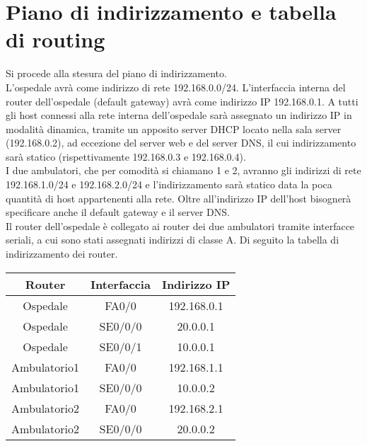 \section{Piano di indirizzamento e tabella di routing}
\hspace{24pt}Si procede alla stesura del piano di indirizzamento.\\
L'ospedale avrà come indirizzo di rete 192.168.0.0/24. L'interfaccia interna del router dell'ospedale (default gateway) avrà come indirizzo IP 192.168.0.1.
A tutti gli host connessi alla rete interna dell'ospedale sarà assegnato un indirizzo IP in modalità dinamica, tramite un
apposito server DHCP locato nella sala server (192.168.0.2), ad eccezione del server web e del server DNS, il cui indirizzamento
sarà statico (rispettivamente 192.168.0.3 e 192.168.0.4).\\
\hspace{24pt}I due ambulatori, che per comodità si chiamano 1 e 2, avranno gli indirizzi di rete 192.168.1.0/24 e 192.168.2.0/24 e
l'indirizzamento sarà statico data la poca quantità di host appartenenti alla rete. Oltre all'indirizzo IP dell'host 
bisognerà specificare anche il default gateway e il server DNS.\\
\hspace{24pt}Il router dell'ospedale è collegato ai router dei due ambulatori tramite interfacce seriali, a cui sono stati assegnati
indirizzi di classe A. Di seguito la tabella di indirizzamento dei router. \\
\vspace*{12pt}
\begin{center}
    \begin{tabular}{| c | c | c |}
        \hline
        Router       & Interfaccia & Indirizzo IP \\ \hline
        Ospedale     & FA0/0       & 192.168.0.1  \\  \hline
        Ospedale     & SE0/0/0     & 20.0.0.1     \\ \hline
        Ospedale     & SE0/0/1     & 10.0.0.1     \\ \hline
        Ambulatorio1 & FA0/0       & 192.168.1.1  \\ \hline
        Ambulatorio1 & SE0/0/0     & 10.0.0.2     \\ \hline
        Ambulatorio2 & FA0/0       & 192.168.2.1  \\ \hline
        Ambulatorio2 & SE0/0/0     & 20.0.0.2     \\ \hline
    \end{tabular}
\end{center}

